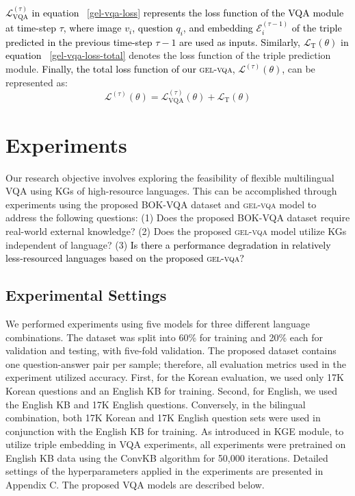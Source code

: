 \documentclass[letterpaper]{article} %
\newcommand{\kt}[1]{\textcolor{black}{#1}}
\begin{document}
\kt{$\mathcal{L}_{\mathrm{VQA}}^{(\tau)}$ in equation ~\eqref{gel-vqa-loss} represents the loss function of the VQA module at time-step $\tau$, where image $v_i$, question $q_i$, and embedding $\mathcal{E}^{(\tau-1)}_i$ of the triple predicted in the previous time-step $\tau-1$ are used as inputs. }
\kt{Similarly, $\mathcal{L}_{\mathrm{T}}(\theta)$ in equation ~\eqref{gel-vqa-loss-total}} denotes the loss function of the triple prediction module. \kt{Finally, the total loss function of our \textsc{gel-vqa}, $\mathcal{L}^{(\tau)}(\theta)$,} can be represented as:
\begin{equation} \label{gel-vqa-loss-total}
\mathcal{L}^{(\tau)}(\theta) = \mathcal{L}_{\mathrm{VQA}}^{(\tau)}(\theta) + \mathcal{L}_{\mathrm{T}}(\theta)
\end{equation}


\section{Experiments}
Our research objective involves exploring the feasibility of flexible multilingual VQA using KGs of high-resource languages. This can be accomplished through experiments using the proposed BOK-VQA dataset and \textsc{gel-vqa} model to address the following questions: (1) Does the proposed BOK-VQA dataset require real-world external knowledge? (2) Does the proposed \textsc{gel-vqa} model utilize KGs independent of language? (3) \kt{Is there a performance degradation in relatively less-resourced languages based on the proposed \textsc{gel-vqa}?}


\subsection{Experimental Settings}\label{subsec:experiment-setting}
We performed experiments using five models for three different language combinations. The dataset was split into 60\% for training and 20\% each for validation and testing, with five-fold validation. %
The proposed dataset contains one question-answer pair per sample; therefore, all evaluation metrics used in the experiment utilized accuracy.
First, for the Korean evaluation, we used only 17K Korean questions and an English KB for training. Second, for English, we used the English KB and 17K English questions. Conversely, in the bilingual combination, both 17K Korean and 17K English question sets were used in conjunction with the English KB for training. As introduced in KGE module, to utilize triple embedding in VQA experiments, all experiments were pretrained on English KB data using the ConvKB algorithm for 50,000 iterations.
Detailed settings of the hyperparameters applied in the experiments are presented in Appendix C. The proposed VQA models are described below. %
\end{document}
